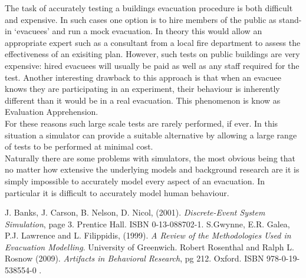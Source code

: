 \documentclass{article}
\begin{document}
The task of accurately testing a buildings evacuation procedure is both difficult and expensive. In such cases one option is to hire members of the public as stand-in `evacuees' and run a mock evacuation. In theory this would allow an appropriate expert such as a consultant from a local fire department to assess the effectiveness of an exisiting plan. However, such tests on public buildings are very expensive: hired evacuees will usually be paid as well as any staff required for the test. Another interesting drawback to this approach is that when an evacuee knows they are participating in an experiment, their behaviour is inherently different than it would be in a real evacuation. This phenomenon is know as Evaluation Apprehension\cite{EvalApprehension}.\\

For these reasons such large scale tests are rarely performed, if ever. In this situation a simulator can provide a suitable alternative by allowing a large range of tests to be performed at minimal cost.\\

Naturally there are some problems with simulators, the most obvious being that no matter how extensive the underlying models and background research are it is simply impossible to accurately model every aspect of an evacuation. In particular it is difficult to accurately model human behaviour. \\


\begin{thebibliography}{9}
J. Banks, J. Carson, B. Nelson, D. Nicol, (2001). \emph{Discrete-Event System Simulation}, page 3. Prentice Hall. ISBN 0-13-088702-1.
 S.Gwynne, E.R. Galea, P.J. Lawrence and L. Filippidis, (1999). \emph{A Review of the Methodologies Used in Evacuation Modelling}. University of Greenwich.
 Robert Rosenthal and Ralph L. Rosnow (2009). \emph{Artifacts in Behavioral Research}, pg 212. Oxford. ISBN 978-0-19-538554-0 .
\end{thebibliography}
\end{document}
